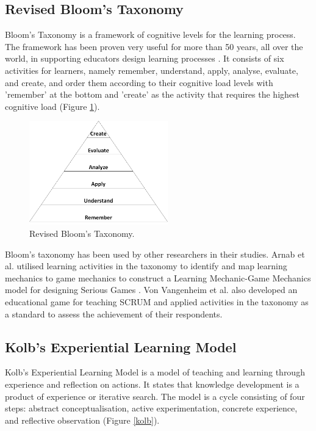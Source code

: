 \documentclass[12pt, a4paper]{report}
\begin{document}
\subsection{Revised Bloom's Taxonomy}
Bloom's Taxonomy \cite{krathwohl2002revision} is a framework of cognitive levels for the learning process. The framework has been proven very useful for more than 50 years, all over the world, in supporting educators design learning processes \cite{munzenmaier2013bloom}. It consists of six activities for learners, namely remember, understand, apply, analyse, evaluate, and create, and order them according to their cognitive load levels with 'remember' at the bottom and 'create' as the activity that requires the highest cognitive load (Figure \ref{bloom}). 

\begin{figure}[ht]
\centering
\includegraphics[width=6cm]{bloom}
\caption{Revised Bloom's Taxonomy\cite{krathwohl2002revision}.}
\label{bloom}
\end{figure}

Bloom's taxonomy has been used by other researchers in their studies. Arnab et al. utilised learning activities in the taxonomy to identify and map learning mechanics to game mechanics to construct a Learning Mechanic-Game Mechanics model for designing Serious Games \cite{arnab2015mapping}. Von Vangenheim et al. \cite{von2013scrumia} also developed an educational game for teaching SCRUM and applied activities in the taxonomy as a standard to assess the achievement of their respondents. 

\subsection{Kolb's Experiential Learning Model}
Kolb's Experiential Learning Model \cite{kolb2014experiential} is a model of teaching and learning through experience and reflection on actions. It states that knowledge development is a product of experience or iterative search. The model is a cycle consisting of four steps: abstract conceptualisation, active experimentation, concrete experience, and reflective observation (Figure \ref{kolb}). 
\end{document}
